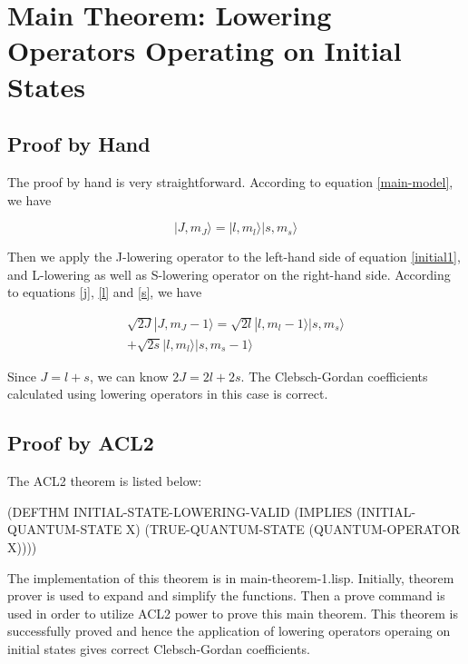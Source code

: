 \documentclass[12pt,journal,compsoc]{IEEEtran}
\begin{document}
\section{Main Theorem: Lowering Operators Operating on Initial States}

\subsection{Proof by Hand}

The proof by hand is very straightforward. According to equation \ref{main-model}, we have 

\begin{equation}
|J, m_J \rangle= |l,m_l\rangle |s,m_s\rangle
\label{initial1}
\end{equation} 

Then we apply the J-lowering operator to the left-hand side of equation \ref{initial1}, and L-lowering as well as S-lowering operator on the right-hand side. According to equations \ref{j}, \ref{l} and \ref{s}, we have 

\begin{equation}
\begin{aligned}
\sqrt{2J}|J,m_J -1\rangle = \sqrt{2l} |l,m_l-1\rangle|s,m_s\rangle\\ + \sqrt{2s}|l,m_l\rangle|s,m_s-1\rangle
\end{aligned}
\label{initial2}
\end{equation}

Since $J=l+s$, we can know $2J=2l+2s$. The Clebsch-Gordan coefficients calculated using lowering operators in this case is correct.

\subsection{Proof by ACL2}

The ACL2 theorem is listed below:

\begin{acl2-lst}
(DEFTHM INITIAL-STATE-LOWERING-VALID
 (IMPLIES (INITIAL-QUANTUM-STATE X)
  (TRUE-QUANTUM-STATE 
	(QUANTUM-OPERATOR X))))
\end{acl2-lst}

The implementation of this theorem is in main-theorem-1.lisp. Initially, theorem prover is used to expand and simplify the functions. Then a prove command is used in order to utilize ACL2 power to prove this main theorem. This theorem is successfully proved and hence the application of lowering operators operaing on initial states gives correct Clebsch-Gordan coefficients.
\end{document}
